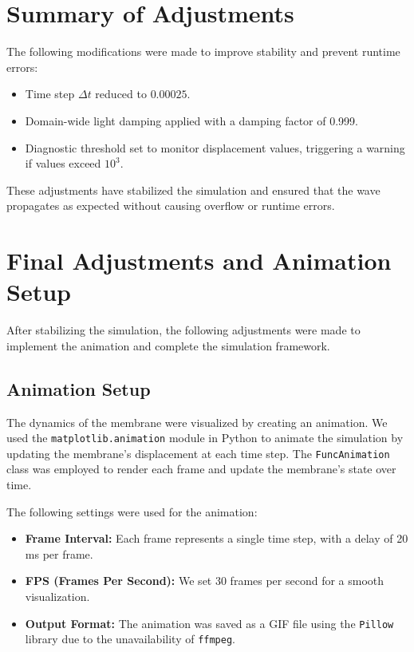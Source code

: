 \documentclass{article}
\begin{document}
\section{Summary of Adjustments}

The following modifications were made to improve stability and prevent runtime errors:
\begin{itemize}
    \item Time step $\Delta t$ reduced to $0.00025$.
    \item Domain-wide light damping applied with a damping factor of 0.999.
    \item Diagnostic threshold set to monitor displacement values, triggering a warning if values exceed $10^3$.
\end{itemize}

These adjustments have stabilized the simulation and ensured that the wave propagates as expected without causing overflow or runtime errors.

\section{Final Adjustments and Animation Setup}

After stabilizing the simulation, the following adjustments were made to implement the animation and complete the simulation framework.

\subsection{Animation Setup}
The dynamics of the membrane were visualized by creating an animation. We used the \texttt{matplotlib.animation} module in Python to animate the simulation by updating the membrane’s displacement at each time step. The \texttt{FuncAnimation} class was employed to render each frame and update the membrane’s state over time.

The following settings were used for the animation:
\begin{itemize}
    \item \textbf{Frame Interval:} Each frame represents a single time step, with a delay of 20 ms per frame.
    \item \textbf{FPS (Frames Per Second):} We set 30 frames per second for a smooth visualization.
    \item \textbf{Output Format:} The animation was saved as a GIF file using the \texttt{Pillow} library due to the unavailability of \texttt{ffmpeg}.
\end{itemize}
\end{document}

